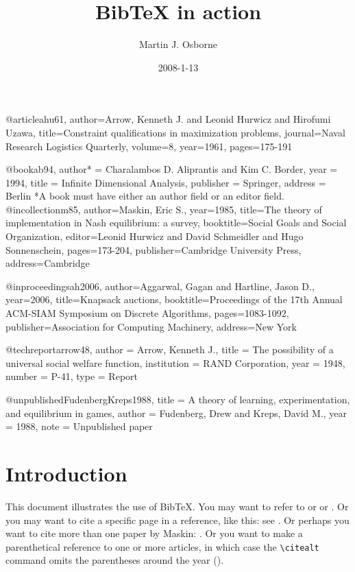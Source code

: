 \documentclass[12pt]{article}
\begin{document}
@article{ahu61,
   author={Arrow, Kenneth J. and Leonid Hurwicz and Hirofumi Uzawa},
   title={Constraint qualifications in maximization problems},
   journal={Naval Research Logistics Quarterly},
   volume={8},
   year=1961,
   pages={175-191}
}

@book{ab94,
   author* = {Charalambos D. Aliprantis and Kim C. Border},
   year = {1994},
   title = {Infinite Dimensional Analysis},
   publisher = {Springer},
   address = {Berlin}
}
*A book must have either an author field or an editor field.
@incollection{m85,
   author={Maskin, Eric S.},
   year={1985},
   title={The theory of implementation in {N}ash equilibrium: a survey},
   booktitle={Social Goals and Social Organization},
   editor={Leonid Hurwicz and David Schmeidler and Hugo Sonnenschein},
   pages={173-204},
   publisher={Cambridge University Press},
   address={Cambridge}
}

@inproceedings{ah2006,
   author={Aggarwal, Gagan and Hartline, Jason D.},
   year={2006},
   title={Knapsack auctions},
   booktitle={Proceedings of the 17th Annual ACM-SIAM Symposium on Discrete Algorithms},
   pages={1083-1092},
   publisher={Association for Computing Machinery},
   address={New York}
}

@techreport{arrow48,
  author = {Arrow, Kenneth J.},
  title = {The possibility of a universal social welfare function},
  institution = {RAND Corporation},
  year = {1948},
  number = {P-41},
  type = {Report}
}

@unpublished{FudenbergKreps1988,
  title = {A theory of learning, experimentation, and equilibrium in games},
  author = {Fudenberg, Drew and Kreps, David M.},
  year = {1988},
  note = {Unpublished paper}
}

\title{BibTeX in action}
\author{Martin J. Osborne}
\date{2008-1-13}
\maketitle

\section{Introduction}
This document illustrates the use of BibTeX\@.  You may want to refer to
\cite{ahu61} or \cite{ab94} or \cite{m85}.  Or you may want to cite a
specific page in a reference, like this: see \citet[p.~199]{m85}.  Or
perhaps you want to cite more than one paper by Maskin: \cite{m85, m99}.
Or you want to make a parenthetical reference to one or more articles, in which case the \verb+\citealt+ command omits the parentheses around the year (\citealt{ahu61}).




\end{document}
